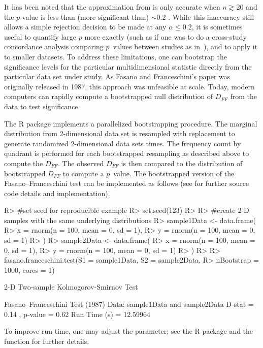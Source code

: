 \documentclass[codesnippet]{jss}
\newcommand{\fct}[1]{\code{#1()}}
\newcommand{\RBnote}[1]{\textcolor{red}{#1}}
\begin{document}
It has been noted that the approximation from  \citep{numericalRecipes} is only accurate when $n \gtrsim 20$ and the $p$-value is less than (more significant than) $\sim 0.2$ \citep{Babu2006}. While this inaccuracy still allows a simple rejection decision to be made at any $\alpha\leq0.2$, it is sometimes useful to quantify large $p$ more exactly (such as if one was to do a cross-study concordance analysis comparing $p$~values between studies as in~\cite{Ness-Cohn2020}), and to apply it to smaller datasets.
%
%
To address these limitations, one can bootstrap the significance levels for the particular multidimensional statistic directly from the particular data set under study. As Fasano and Franceschini's paper was originally released in 1987, this approach was unfeasible at scale.  Today, modern computers can rapidly compute a bootstrapped null distribution of $D_{FF}$ from the data to test significance.

The  R package implements a parallelized
bootstrapping procedure. The marginal distribution from 2-dimensional
data set is resampled with replacement to generate randomized
2-dimensional data sets  times. The frequency count
by quadrant is performed for each bootstrapped resampling as described
above to compute the $D_{FF}$. The observed $D_{FF}$ is then compared
to the distribution of bootstrapped $D_{FF}$ to compute a $p$~value.
The bootstrapped version of the Fasano--Franceschini test can be
implemented as follows (see \fct{fasano.franceschini.test} for further
source code details and implementation).

\begin{CodeChunk}
\begin{CodeInput}
R> #set seed for reproducible example
R> set.seed(123)
R>
R> #create 2-D samples with the same underlying distributions
R> sample1Data <- data.frame(
R>  x = rnorm(n = 100, mean = 0, sd = 1),
R>  y = rnorm(n = 100, mean = 0, sd = 1)
R> )
R> sample2Data <- data.frame(
R>  x = rnorm(n = 100, mean = 0, sd = 1),
R>  y = rnorm(n = 100, mean = 0, sd = 1)
R> )
R>
R> fasano.franceschini.test(S1 = sample1Data, S2 = sample2Data,
R>                          nBootstrap = 1000, cores = 1)
\end{CodeInput}
\begin{CodeOutput}
      2-D Two-sample Kolmogorov-Smirnov Test

 Fasano--Franceschini Test (1987)
 Data:  sample1Data and sample2Data
 D-stat =  0.14 , p-value =  0.62
 Run Time (s) =  12.59964
\end{CodeOutput}
\end{CodeChunk}
To improve run time, one may adjust the  parameter; see the R  package and the \fct{mclapply} function for further details.
\end{document}
